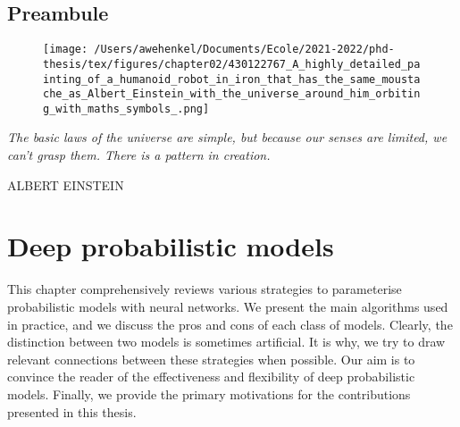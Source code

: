 \thispagestyle{empty}
\section*{Preambule}

\begin{figure}[h]
  \centering

  \texttt{[image: /Users/awehenkel/Documents/Ecole/2021-2022/phd-thesis/tex/figures/chapter02/430122767\_A\_highly\_detailed\_painting\_of\_a\_humanoid\_robot\_in\_iron\_that\_has\_the\_same\_moustache\_as\_Albert\_Einstein\_with\_the\_universe\_around\_him\_orbiting\_with\_maths\_symbols\_.png]}
  \label{}
\end{figure}

\vfill

{
\textit{\justify
   The basic laws of the universe are simple, but because our senses are limited, we can't grasp them. There is a pattern in creation.}

  \par\bigskip
  \raggedleft\MakeUppercase{Albert Einstein}\\
  \par%
}

\chapter{Deep probabilistic models}\label{ch:02}

\begin{chapter_outline}

This chapter comprehensively reviews various strategies to parameterise probabilistic models with neural networks. We present the main algorithms used in practice, and we discuss the pros and cons of each class of models.
Clearly, the distinction between two models is sometimes artificial. It is why, we try to draw relevant connections between these strategies when possible.
Our aim is to convince the reader of the effectiveness and flexibility of deep probabilistic models. Finally, we provide the primary motivations for the contributions presented in this thesis.
\end{chapter_outline}

